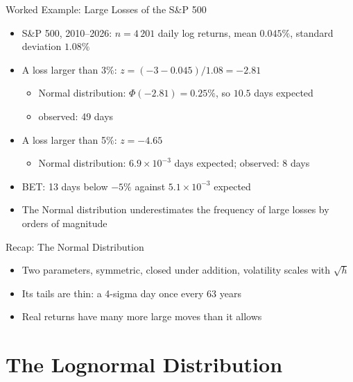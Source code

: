 \begin{frame}{Worked Example: Large Losses of the S\&P 500}
\itemsize{\footnotesize}
\begin{itemize}
    \item S\&P 500, 2010--2026: $n = 4\,201$ daily log returns, mean $0.045\%$, standard deviation $1.08\%$
    \item A loss larger than 3\%: $z = (-3 - 0.045)/1.08 = -2.81$
    \begin{itemize}
        \item Normal distribution: $\Phi(-2.81) = 0.25\%$, so $10.5$ days expected
        \item observed: 49 days
    \end{itemize}
    \item A loss larger than 5\%: $z = -4.65$
    \begin{itemize}
        \item Normal distribution: $6.9 \times 10^{-3}$ days expected; observed: 8 days
    \end{itemize}
    \item BET: 13 days below $-5\%$ against $5.1 \times 10^{-3}$ expected
    \item The Normal distribution underestimates the frequency of large losses by orders of magnitude
\end{itemize}
\end{frame}

\begin{frame}{Recap: The Normal Distribution}
\itemsize{\small}
\begin{itemize}
    \item Two parameters, symmetric, closed under addition, volatility scales with $\sqrt{h}$
    \item Its tails are thin: a 4-sigma day once every 63 years
    \item Real returns have many more large moves than it allows
\end{itemize}
\end{frame}


\section{The Lognormal Distribution}

